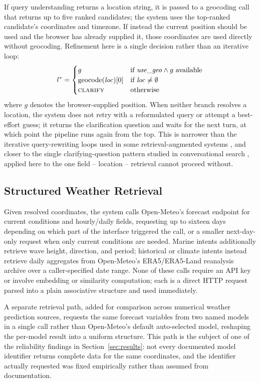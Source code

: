 \documentclass[sigconf,natbib=true,anonymous=true]{acmart}
\begin{document}
If query understanding returns a location string, it is passed to a geocoding call that returns up to five ranked candidates; the system uses the top-ranked candidate's coordinates and timezone. If instead the current position should be used and the browser has already supplied it, those coordinates are used directly without geocoding. Refinement here is a single decision rather than an iterative loop:
\begin{equation}
  l^{*} =
  \begin{cases}
    g & \text{if } \mathit{use\_geo} \wedge g \text{ available} \\
    \mathrm{geocode}(\mathit{loc})[0] & \text{if } \mathit{loc} \neq \emptyset \\
    \textsc{clarify} & \text{otherwise}
  \end{cases}
  \label{eq:location}
\end{equation}
where $g$ denotes the browser-supplied position. When neither branch resolves a location, the system does not retry with a reformulated query or attempt a best-effort guess; it returns the clarification question and waits for the next turn, at which point the pipeline runs again from the top. This is narrower than the iterative query-rewriting loops used in some retrieval-augmented systems \citep{yan2024crag}, and closer to the single clarifying-question pattern studied in conversational search \citep{aliannejadi2019clarifying}, applied here to the one field -- location -- retrieval cannot proceed without.

\subsection{Structured Weather Retrieval}

Given resolved coordinates, the system calls Open-Meteo's forecast endpoint for current conditions and hourly/daily fields, requesting up to sixteen days depending on which part of the interface triggered the call, or a smaller next-day-only request when only current conditions are needed. Marine intents additionally retrieve wave height, direction, and period; historical or climate intents instead retrieve daily aggregates from Open-Meteo's ERA5/ERA5-Land reanalysis archive over a caller-specified date range. None of these calls require an API key or involve embedding or similarity computation; each is a direct HTTP request parsed into a plain associative structure and used immediately.

A separate retrieval path, added for comparison across numerical weather prediction sources, requests the same forecast variables from two named models in a single call rather than Open-Meteo's default auto-selected model, reshaping the per-model result into a uniform structure. This path is the subject of one of the reliability findings in Section~\ref{sec:results}: not every documented model identifier returns complete data for the same coordinates, and the identifier actually requested was fixed empirically rather than assumed from documentation.
\end{document}
